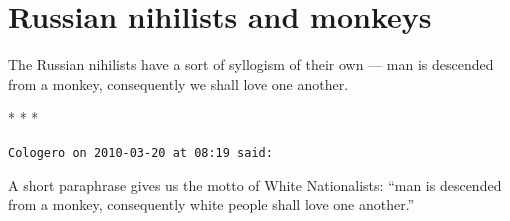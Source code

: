 \section{Russian nihilists and monkeys}

\begin{quotex}
The Russian nihilists have a sort of syllogism of their own --- man is descended from a monkey, consequently we shall love one another.
\end{quotex}





\begin{center}* * *\end{center}

\begin{footnotesize}
\begin{sffamily}
\texttt{Cologero on 2010-03-20 at 08:19 said:}

A short paraphrase gives us the motto of White Nationalists: ``man is descended from a monkey, consequently white people shall love one another.''

\end{sffamily}
\end{footnotesize}

